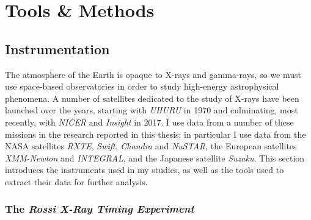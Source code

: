 \chapter{Tools \& Methods}

\section{Instrumentation}

\par The atmosphere of the Earth is opaque to X-rays and gamma-rays, so we must use space-based observatories in order to study high-energy astrophysical phenomena.  A number of satellites dedicated to the study of X-rays have been launched over the years, starting with \textit{UHURU} in 1970 \citep{Giacconi_Uhuru} and culminating, most recently, with \textit{NICER} \citep{Gendreau_Nicer} and \textit{Insight} \citep{Li_HXMT} in 2017.  I use data from a number of these missions in the research reported in this thesis; in particular I use data from the NASA satellites \textit{RXTE}, \textit{Swift}, \textit{Chandra} and \textit{NuSTAR}, the European satellites \textit{XMM-Newton} and \textit{INTEGRAL}, and the Japanese satellite \textit{Suzaku}.  This section introduces the instruments used in my studies, as well as the tools used to extract their data for further analysis.

\subsection{The \textit{Rossi X-Ray Timing Experiment}}

